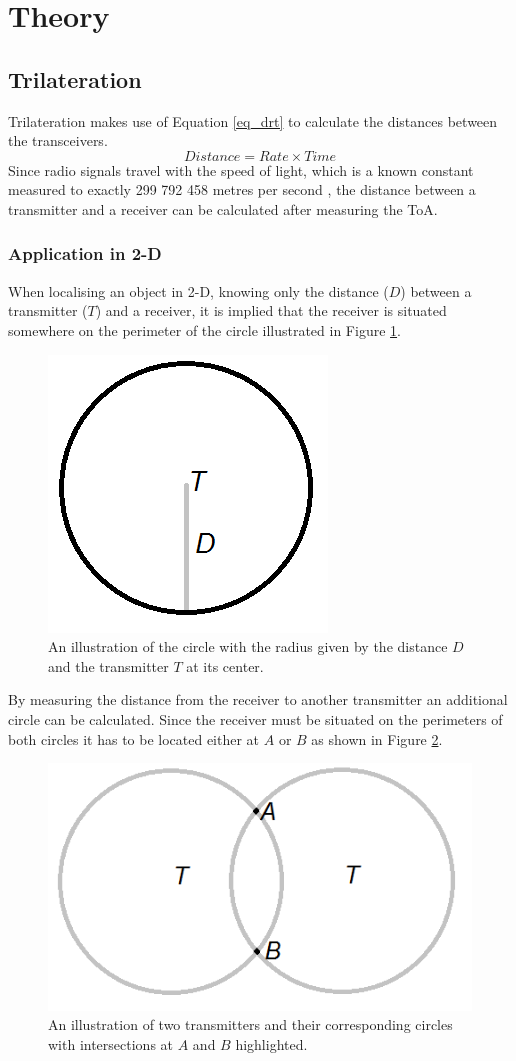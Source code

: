 \section{Theory}

	\subsection{Trilateration}
		Trilateration makes use of Equation \ref{eq_drt} to calculate the distances between the transceivers. 
		\begin{equation} \label{eq_drt}
		Distance = Rate \times Time
		\end{equation}
		Since radio signals travel with the speed of light, which is a known constant measured to exactly 299 792 458 metres per second 
		\cite{young_university_2004,uzan_natural_2010}, the distance between a transmitter and a receiver can be calculated after measuring the ToA.

		\subsubsection{Application in 2-D} \label{Trilateration2D}
			When localising an object in 2-D, knowing only the distance ($D$) between a transmitter ($T$) and a receiver, it is implied that the receiver is situated somewhere on the perimeter of the circle illustrated in Figure \ref{fig_circle}.
			\begin{figure}[H] 
			  \centering
			      \includegraphics[height=0.25\textwidth]{img/Circle}
			  \caption{An illustration of the circle with the radius given by the distance $D$ and the transmitter $T$ at its center.}
			  \label{fig_circle}
			\end{figure}

			By measuring the distance from the receiver to another transmitter an additional circle can be calculated. Since the receiver must be situated on the perimeters of both circles it has to be located either at $A$ or $B$ as shown in Figure \ref{fig_2circles}.

			\begin{figure}[H] 
			  \centering
			      \includegraphics[height=0.25\textwidth]{img/2Circles}
			  \caption{An illustration of two transmitters and their corresponding circles with intersections at $A$ and $B$ highlighted.}
			  \label{fig_2circles}
			\end{figure}

